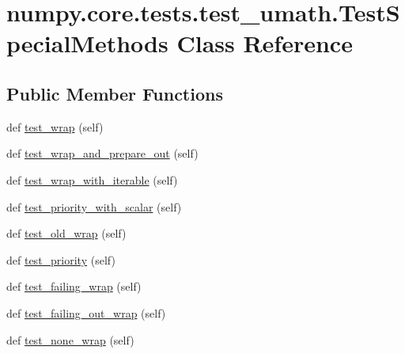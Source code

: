 \hypertarget{classnumpy_1_1core_1_1tests_1_1test__umath_1_1TestSpecialMethods}{}\section{numpy.\+core.\+tests.\+test\+\_\+umath.\+Test\+Special\+Methods Class Reference}
\label{classnumpy_1_1core_1_1tests_1_1test__umath_1_1TestSpecialMethods}
\subsection*{Public Member Functions}
\begin{DoxyCompactItemize}
\item 
def \hyperlink{classnumpy_1_1core_1_1tests_1_1test__umath_1_1TestSpecialMethods_a6729b3f58a0527f5bdaddb0bc69c5895}{test\+\_\+wrap} (self)
\item 
def \hyperlink{classnumpy_1_1core_1_1tests_1_1test__umath_1_1TestSpecialMethods_ac72146b3542e5c5ea598a1cfef6687b9}{test\+\_\+wrap\+\_\+and\+\_\+prepare\+\_\+out} (self)
\item 
def \hyperlink{classnumpy_1_1core_1_1tests_1_1test__umath_1_1TestSpecialMethods_ab50e0d7be3a9fe53d30ff4d671052629}{test\+\_\+wrap\+\_\+with\+\_\+iterable} (self)
\item 
def \hyperlink{classnumpy_1_1core_1_1tests_1_1test__umath_1_1TestSpecialMethods_ae8353682ee7c094b9ef68b71eb6032cf}{test\+\_\+priority\+\_\+with\+\_\+scalar} (self)
\item 
def \hyperlink{classnumpy_1_1core_1_1tests_1_1test__umath_1_1TestSpecialMethods_a3537422af7d562779d499ec8a5a332a8}{test\+\_\+old\+\_\+wrap} (self)
\item 
def \hyperlink{classnumpy_1_1core_1_1tests_1_1test__umath_1_1TestSpecialMethods_aba648fa664eae342eb5e98f428f54a2d}{test\+\_\+priority} (self)
\item 
def \hyperlink{classnumpy_1_1core_1_1tests_1_1test__umath_1_1TestSpecialMethods_a5e7d4a31cf19d9810966e27a74df8e1f}{test\+\_\+failing\+\_\+wrap} (self)
\item 
def \hyperlink{classnumpy_1_1core_1_1tests_1_1test__umath_1_1TestSpecialMethods_ab5c028795315e321e45c33d85ba1434b}{test\+\_\+failing\+\_\+out\+\_\+wrap} (self)
\item 
def \hyperlink{classnumpy_1_1core_1_1tests_1_1test__umath_1_1TestSpecialMethods_a21f8422a3380920df63944895477b11c}{test\+\_\+none\+\_\+wrap} (self)

\end{DoxyCompactItemize}
